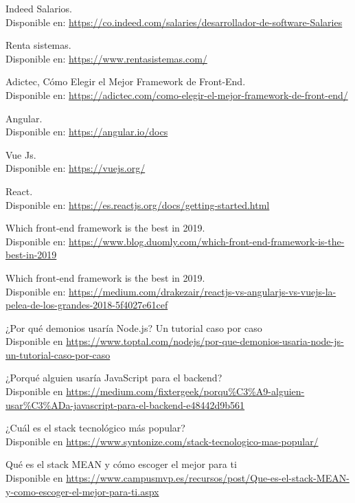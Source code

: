 \documentclass[a4paper,12 pt]{article}
\begin{document}
\begin{thebibliography}{50}

 Indeed Salarios. \\
Disponible en: 
\url{https://co.indeed.com/salaries/desarrollador-de-software-Salaries}

 Renta sistemas.\\
Disponible en:
\url{https://www.rentasistemas.com/}

Adictec, Cómo Elegir el Mejor Framework de Front-End.\\
Disponible en:
\url{https://adictec.com/como-elegir-el-mejor-framework-de-front-end/}

Angular.\\
Disponible en:
\url{https://angular.io/docs}

Vue Js.\\
Disponible en:
\url{https://vuejs.org/}

React.\\
Disponible en:
\url{https://es.reactjs.org/docs/getting-started.html}

Which front-end framework is the best in 2019.\\
Disponible en:
\url{https://www.blog.duomly.com/which-front-end-framework-is-the-best-in-2019}

Which front-end framework is the best in 2019.\\
Disponible en:
\url{https://medium.com/drakezair/reactjs-vs-angularjs-vs-vuejs-la-pelea-de-los-grandes-2018-5f4027e61cef}

 ¿Por qué demonios usaría Node.js? Un tutorial caso por caso\\
Disponible en 
\url{https://www.toptal.com/nodejs/por-que-demonios-usaria-node-js-un-tutorial-caso-por-caso}

 ¿Porqué alguien usaría JavaScript para el backend?\\
Disponible en 
\url{https://medium.com/fixtergeek/porqu%C3%A9-alguien-usar%C3%ADa-javascript-para-el-backend-e48442d9b561}

 ¿Cuál es el stack tecnológico más popular?\\
Disponible en 
\url{https://www.syntonize.com/stack-tecnologico-mas-popular/}

 Qué es el stack MEAN y cómo escoger el mejor para ti\\
Disponible en 
\url{https://www.campusmvp.es/recursos/post/Que-es-el-stack-MEAN-y-como-escoger-el-mejor-para-ti.aspx}

\end{thebibliography}{}
\end{document}
